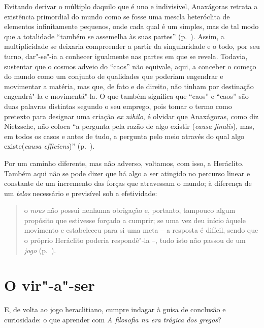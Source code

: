 Evitando derivar o múltiplo daquilo que é uno e indivisível, Anaxágoras
retrata a existência primordial do mundo como se fosse uma mescla heteróclita
de elementos infinitamente pequenos, onde cada qual é um simples, mas de tal
modo que a totalidade ``também se assemelha às suas partes'' (p.~\pageref{suaspartes}). 
Assim, a multiplicidade se deixaria compreender a partir da
singularidade e o todo, por seu turno, dar"-se"-ia a conhecer igualmente nas
partes em que se revela. Todavia, sustentar que o cosmos adveio do ``caos''
não equivale, aqui, a conceber o começo do mundo como um conjunto de
qualidades que poderiam engendrar e movimentar a matéria, mas que, de fato e
de direito, não tinham por destinação engendrá"-la e movimentá"-la. O que
também significa que ``caos'' e ``caos'' são duas palavras distintas segundo
o seu emprego, pois tomar o termo como pretexto para designar uma
criação \textit{ex nihilo}, é olvidar que Anaxágoras, como diz Nietzsche, não
coloca ``a pergunta pela razão de algo existir (\textit{causa finalis}), mas,
em todos os casos e antes de tudo, a pergunta pelo meio através do qual algo
existe(\textit{causa efficiens})'' (p.~\pageref{causafinalis}).

Por um caminho diferente, mas não adverso, voltamos, com isso, a Heráclito.
Também aqui não se pode dizer que há algo a ser atingido no percurso linear e
constante de um incremento das forças que atravessam o mundo; à diferença de
um \textit{telos} necessário e previsível sob a efetividade: 

\begin{quote} o \textit{nous} não possui nenhuma obrigação e, portanto,
 tampouco algum propósito que estivesse forçado a cumprir; se uma vez deu
 início àquele movimento e estabeleceu para si uma meta -- a resposta é
 difícil, sendo que o próprio Heráclito poderia respondê"-la --, tudo isto
 não passou de um
\textit{jogo} (p.~\pageref{naopossuinenhuma}).
\end{quote} 

\section{O vir"-a"-ser}

 E, de volta ao jogo heraclitiano, cumpre indagar à
 guisa de conclusão e curiosidade: o que aprender com \textit{A filosofia na
 era trágica dos gregos}?

